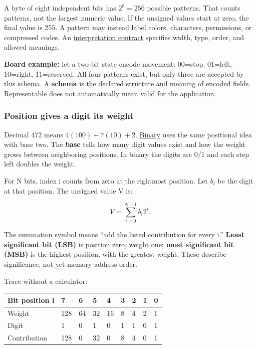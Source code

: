 A byte of eight independent bits has \(2^8=256\) possible patterns. That counts patterns, not the largest numeric value. If the unsigned values start at zero, the final value is 255. A pattern may instead label colors, characters, permissions, or compressed codes. An \hyperref[appendix-f414bd4ed05c]{interpretation contract} specifies width, type, order, and allowed meanings.

\textbf{Board example:} let a two-bit state encode movement: 00=stop, 01=left, 10=right, 11=reserved. All four patterns exist, but only three are accepted by this schema. A \textbf{schema} is the declared structure and meaning of encoded fields. Representable does not automatically mean valid for the application.

\subsubsection{Position gives a digit its weight}\label{01-foundations-i-ch001-position-gives-a-digit-its-weight}

\hypertarget{01-foundations-i-ch001-position-gives-a-digit-its-weight}{}

Decimal 472 means \(4(100)+7(10)+2\). \hyperref[appendix-83c3f28f7bda]{Binary} uses the same positional idea with base two. The \textbf{base} tells how many digit values exist and how the weight grows between neighboring positions. In binary the digits are 0/1 and each step left doubles the weight.

For N bits, index i counts from zero at the rightmost position. Let \(b_i\) be the digit at that position. The unsigned value V is:

\[
V=\sum_{i=0}^{N-1}b_i2^i.
\]

The summation symbol means ``add the listed contribution for every i.'' \textbf{Least significant bit (LSB)} is position zero, weight one; \textbf{most significant bit (MSB)} is the highest position, with the greatest weight. These describe significance, not yet memory address order.

Trace  without a calculator:

{\def\LTcaptype{none} %
\begin{longtable}[]{@{}lllllllll@{}}
\toprule\noalign{}
Bit position i & 7 & 6 & 5 & 4 & 3 & 2 & 1 & 0 \\
\midrule\noalign{}
\endhead
\bottomrule\noalign{}
\endlastfoot
Weight & 128 & 64 & 32 & 16 & 8 & 4 & 2 & 1 \\
Digit & 1 & 0 & 1 & 0 & 1 & 1 & 0 & 1 \\
Contribution & 128 & 0 & 32 & 0 & 8 & 4 & 0 & 1 \\
\end{longtable}
}

